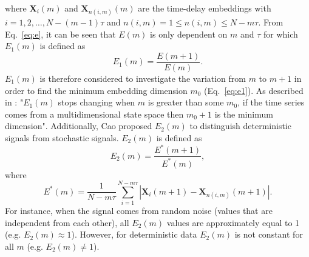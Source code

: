 \documentclass[fleqn,10pt]{wlscirep}
\begin{document}
where $\boldsymbol{X}_i(m)$ and $\boldsymbol{X}_{n(i,m)}(m)$ are the time-delay
embeddings with $i=1,2,\dots,N-(m-1)\tau$ and $ n(i,m)= 1 \le n(i,m) \le N-m\tau$.
From Eq.~\ref{eq:e}, it can be seen that $E(m)$ is only dependent on $m$ 
and $\tau$ for which $E_1(m)$ is defined as
\begin{equation}\label{eq:e1}
E_1(m) = \frac{ E(m+1) } { E(m)}.
\end{equation}
$E_1(m)$ is therefore considered to investigate the variation from $m$ to $m+1$
in order to find the minimum embedding dimension $m_0$ (Eq.~\ref{eq:e1}).
As described in \cite{Cao1997}: "$E_1(m)$ stops changing when $m$ is greater
than some $m_0$, if the time series comes from a multidimensional state space
then $m_0 + 1$ is the minimum dimension".
Additionally, Cao proposed $E_2(m)$ to distinguish deterministic signals from
stochastic signals. $E_2(m)$ is defined as
\begin{equation}\label{eq:e2}
E_2(m) = \frac{ E^* (m+1) } { E^*(m)},
\end{equation}
where
\begin{equation}\label{eq:ee}
E^*(m) = \frac{1}{N-m\tau} \sum_{i=1}^{N-m\tau}
|  \boldsymbol{X}_i(m+1) - \boldsymbol{X}_{n(i,m)}(m+1) |.
\end{equation}
For instance, when the signal comes from random noise (values that are 
independent from each other), all $E_2(m)$ values are approximately equal 
to 1 (e.g. $E_2(m) \approx 1$). However, for deterministic data $E_2(m)$ is 
not constant for all $m$ (e.g. $E_2(m) \neq 1$).
\end{document}
